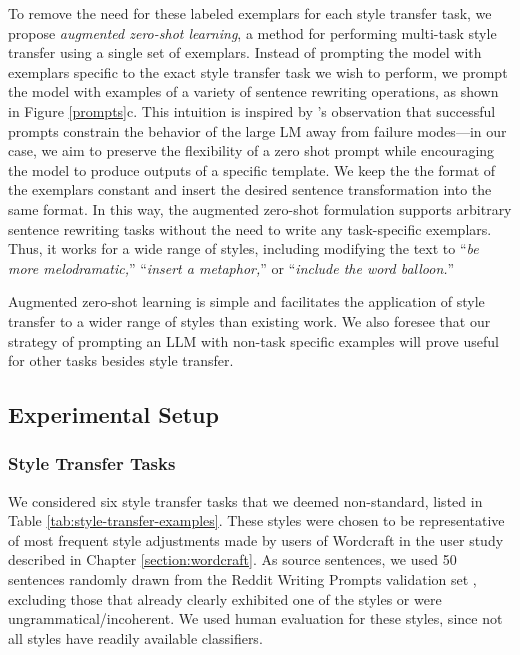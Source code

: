 To remove the need for these labeled exemplars for each style transfer task, we propose \textit{augmented zero-shot learning}, a method for performing multi-task style transfer using a single set of exemplars.
Instead of prompting the model with exemplars specific to the exact style transfer task we wish to perform, we prompt the model with examples of a variety of sentence rewriting operations, as shown in Figure \ref{prompts}c. 
This intuition is inspired by \citet{reynolds2021prompt}'s observation that successful prompts constrain the behavior of the large LM away from failure modes---in our case, we aim to preserve the flexibility of a zero shot prompt while encouraging the model to produce outputs of a specific template.
We keep the the format of the exemplars constant and insert the desired sentence transformation into the same format.
In this way, the augmented zero-shot formulation supports arbitrary sentence rewriting tasks without the need to write any task-specific exemplars.
Thus, it works for a wide range of styles, including modifying the text to ``\textit{be more melodramatic,}'' ``\textit{insert a metaphor,}'' or ``\textit{include the word balloon.}''

Augmented zero-shot learning is simple and facilitates the application of style transfer to a wider range of styles than existing work.
We also foresee that our strategy of prompting an LLM with non-task specific examples will prove useful for other tasks besides style transfer.

\subsection{Experimental Setup}


\subsubsection{Style Transfer Tasks}
We considered six style transfer tasks that we deemed non-standard, listed in Table \ref{tab:style-transfer-examples}.
These styles were chosen to be representative of most frequent style adjustments made by users of Wordcraft in the user study described in Chapter \ref{section:wordcraft}.
As source sentences, we used 50 sentences randomly drawn from the Reddit Writing Prompts validation set \citep{fan2018hierarchical}, excluding those that already clearly exhibited one of the styles or were ungrammatical/incoherent.
We used human evaluation for these styles, since not all styles have readily available classifiers.

